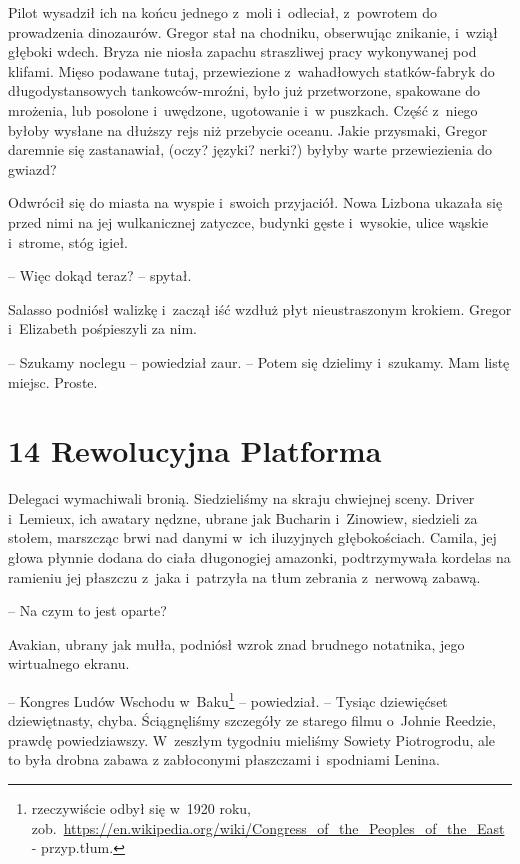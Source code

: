 \documentclass[oneside,polish,12pt,sfheadings]{mwbk}
\begin{document}
Pilot wysadził ich na końcu jednego z~moli i~odleciał, z~powrotem do
prowadzenia dinozaurów. Gregor stał na chodniku, obserwując znikanie, i~wziął głęboki wdech. Bryza nie niosła zapachu straszliwej pracy
wykonywanej pod klifami. Mięso podawane tutaj, przewiezione z~wahadłowych statków-fabryk do długodystansowych tankowców-mroźni, było
już przetworzone, spakowane do mrożenia, lub posolone i~uwędzone,
ugotowanie i~w puszkach. Część z~niego byłoby wysłane na dłuższy rejs
niż przebycie oceanu. Jakie przysmaki, Gregor daremnie się zastanawiał,
(oczy? języki? nerki?) byłyby warte przewiezienia do gwiazd?

Odwrócił się do miasta na wyspie i~swoich przyjaciół. Nowa Lizbona
ukazała się przed nimi na jej wulkanicznej zatyczce, budynki gęste i~wysokie, ulice wąskie i~strome, stóg igieł.

-- Więc dokąd teraz? -- spytał.

Salasso podniósł walizkę i~zaczął iść wzdłuż płyt nieustraszonym
krokiem. Gregor i~Elizabeth pośpieszyli za nim.

-- Szukamy noclegu -- powiedział zaur. -- Potem się dzielimy i~szukamy. Mam
listę miejsc. Proste.



\chapter[Rewolucyjna Platforma]{14 Rewolucyjna Platforma}

Delegaci wymachiwali bronią. Siedzieliśmy na skraju chwiejnej sceny.
Driver i~Lemieux, ich awatary nędzne, ubrane jak Bucharin i~Zinowiew,
siedzieli za stołem, marszcząc brwi nad danymi w~ich iluzyjnych
głębokościach. Camila, jej głowa płynnie dodana do ciała długonogiej
amazonki, podtrzymywała kordelas na ramieniu jej płaszczu z~jaka i~patrzyła na tłum zebrania z~nerwową zabawą.

-- Na czym to jest oparte?

Avakian, ubrany jak mułła, podniósł wzrok znad brudnego notatnika, jego
wirtualnego ekranu.

-- Kongres Ludów Wschodu w~Baku\footnote{rzeczywiście
odbył się w~1920 roku, zob.~\url{https://en.wikipedia.org/wiki/Congress\_of\_the\_Peoples\_of\_the\_East} - przyp.tłum.}
-- powiedział. -- Tysiąc dziewięćset dziewiętnasty, chyba. Ściągnęliśmy
szczegóły ze starego filmu o~Johnie Reedzie, prawdę powiedziawszy. W~zeszłym tygodniu mieliśmy Sowiety Piotrogrodu, ale to była drobna zabawa
z zabłoconymi płaszczami i~spodniami Lenina.
\end{document}
